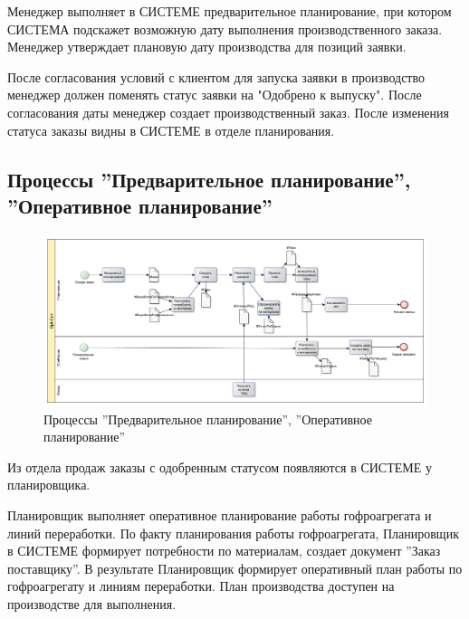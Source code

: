 

Менеджер выполняет в СИСТЕМЕ предварительное планирование, при котором СИСТЕМА подскажет возможную дату выполнения производственного заказа. 
Менеджер  утверждает плановую дату производства для позиций заявки.

После согласования условий с клиентом для запуска заявки в производство менеджер должен поменять статус заявки на "Одобрено к выпуску". После согласования даты менеджер создает производственный заказ. После изменения статуса заказы видны в СИСТЕМЕ в отделе планирования. 
   
\subsection{Процессы ''Предварительное планирование'', ''Оперативное планирование''}
%
\begin{figure}
\begin{center}
  \includegraphics[angle=90, height=0.8\textheight, keepaspectratio]{Pics/3_Plan.pdf}
\end{center}
  \caption{Процессы ''Предварительное планирование'', ''Оперативное планирование''}
  \label{pic:Schema_3}
\end{figure}
\clearpage


Из отдела продаж заказы с одобренным статусом появляются в СИСТЕМЕ у планировщика.

Планировщик выполняет оперативное планирование работы гофроагрегата и линий переработки. По факту планирования работы гофроагрегата, Планировщик в СИСТЕМЕ формирует потребности по материалам, создает документ ''Заказ поставщику''. 
В результате Планировщик формирует оперативный план работы по гофроагрегату и линиям переработки.
План производства доступен на производстве для выполнения.




